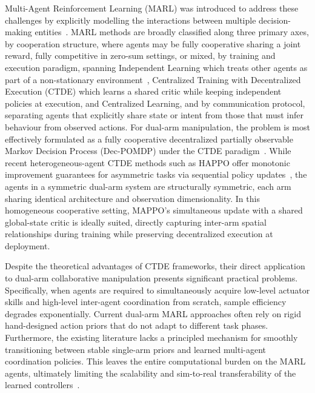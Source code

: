 Multi-Agent Reinforcement Learning (MARL) was introduced to address these challenges by explicitly
modelling the interactions between multiple decision-making
entities~\citep{albrecht2024multi,low2025cooperative}. MARL methods are broadly classified along three primary axes, by cooperation structure, where
agents may be fully cooperative sharing a joint reward, fully competitive in zero-sum settings, or
mixed, by training and execution paradigm, spanning Independent Learning which treats other agents
as part of a non-stationary environment~\citep{dewitt2020independent}, Centralized Training with
Decentralized Execution (CTDE) which learns a shared critic while keeping independent policies at
execution, and Centralized Learning, and by communication protocol, separating agents that
explicitly share state or intent from those that must infer behaviour from observed actions. For
dual-arm manipulation, the problem is most effectively formulated as a fully
cooperative decentralized partially observable Markov Decision Process (Dec-POMDP) under the CTDE
paradigm~\citep{yu2022surprising}. While recent heterogeneous-agent CTDE methods such as
HAPPO offer monotonic improvement guarantees for asymmetric tasks via sequential policy
updates~\citep{kuba2021trust}, the agents in a symmetric dual-arm system are structurally symmetric,
each arm sharing identical architecture and observation dimensionality. In this homogeneous
cooperative setting, MAPPO's simultaneous update with a shared global-state critic is ideally
suited, directly capturing inter-arm spatial relationships during training while preserving
decentralized execution at deployment.

Despite the theoretical advantages of CTDE frameworks, their direct application to dual-arm
collaborative manipulation presents significant practical problems. Specifically, when agents are
required to simultaneously acquire low-level actuator skills and high-level inter-agent coordination
from scratch, sample efficiency degrades exponentially. Current dual-arm MARL approaches often rely
on rigid hand-designed action priors that do not adapt to different task phases. Furthermore, the
existing literature lacks a principled mechanism for smoothly transitioning between stable
single-arm priors and learned multi-agent coordination policies. This leaves the entire
computational burden on the MARL agents, ultimately limiting the scalability and sim-to-real
transferability of the learned controllers~\citep{alles2022learning}.

